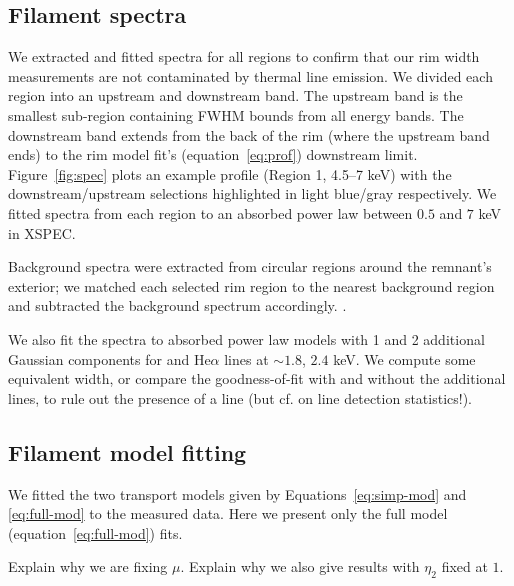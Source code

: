 \documentclass[12pt,preprint]{aastex}  %
\newcommand*{\abt}{\mathord{\sim}} %
\begin{document}
\subsection{Filament spectra}

We extracted and fitted spectra for all regions to confirm that our rim width
measurements are not contaminated by thermal line emission.
We divided each region into an upstream and downstream band.  The upstream band
is the smallest sub-region containing FWHM bounds from all energy bands.
The downstream band extends from the back of the rim (where the upstream band
ends) to the rim model fit's (equation~\eqref{eq:prof}) downstream limit.
Figure~\ref{fig:spec} plots an example profile (Region 1, 4.5--7 keV) with the
downstream/upstream selections highlighted in light blue/gray respectively.
We fitted spectra from each region to an absorbed power law between $0.5$ and $7$
keV in XSPEC.

Background spectra were extracted from circular regions around the remnant's
exterior; we matched each selected rim region to the nearest background region
and subtracted the background spectrum accordingly. .

 We also fit the spectra to absorbed power law models with
1 and 2 additional Gaussian components for  and
 He$\alpha$ lines  at $\abt 1.8$, $2.4$ keV.
We compute some equivalent width, or compare the goodness-of-fit with and
without the additional lines, to rule out the presence of a line
(but cf. \citet{protassov2002} on line detection statistics!).

\subsection{Filament model fitting}

We fitted the two transport models given by Equations~\eqref{eq:simp-mod} and
\eqref{eq:full-mod} to the measured data.  Here we present only the full
model (equation~\eqref{eq:full-mod}) fits.  

Explain why we are fixing $\mu$.
Explain why we also give results with $\eta_2$ fixed at $1$.
\end{document}
